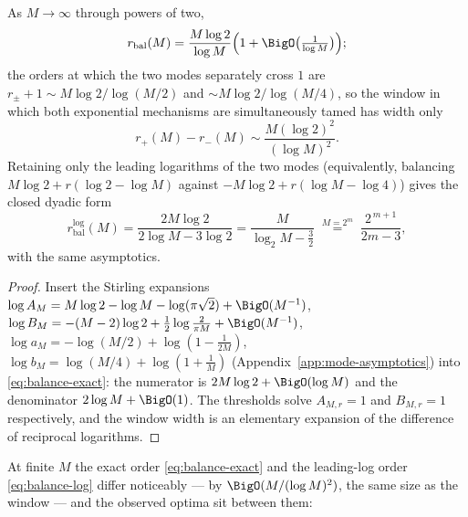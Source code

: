 \begin{proposition}
\label{prop:balance-asymptotic}
As $M\to\infty$ through powers of two,
\begin{equation}
 r_{\mathrm{bal}}(M)
 =\frac{M\log2}{\log M}
 \Bigl(1+\BigO\bigl(\tfrac1{\log M}\bigr)\Bigr);
 \label{eq:balance-asymptotic}
\end{equation}
the orders at which the two modes separately cross $1$ are
$r_\pm+1\sim M\log2/\log(M/2)$ and $\sim M\log2/\log(M/4)$, so the
window in which both exponential mechanisms are simultaneously tamed
has width only
\begin{equation}
 r_+(M)-r_-(M)\sim\frac{M(\log2)^{2}}{(\log M)^{2}}.
 \label{eq:window-width}
\end{equation}
Retaining only the leading logarithms of the two modes
(equivalently, balancing $M\log2+r(\log2-\log M)$ against
$-M\log2+r(\log M-\log4)$) gives the closed dyadic form
\begin{equation}
 r_{\mathrm{bal}}^{\log}(M)
 =\frac{2M\log2}{2\log M-3\log2}
 =\frac{M}{\log_2M-\tfrac32}
 \;\overset{M=2^{m}}{=}\;
 \frac{2^{\,m+1}}{2m-3},
 \label{eq:balance-log}
\end{equation}
with the same asymptotics.
\end{proposition}

\begin{proof}
Insert the Stirling expansions
$\log A_M=M\log2-\log M-\log(\pi\sqrt2)+\BigO(M^{-1})$,
$\log B_M=-(M-2)\log2+\tfrac12\log\tfrac2{\pi M}+\BigO(M^{-1})$,
$\log a_M=-\log(M/2)+\log(1-\tfrac1{2M})$,
$\log b_M=\log(M/4)+\log(1+\tfrac1M)$
(Appendix~\ref{app:mode-asymptotics}) into \eqref{eq:balance-exact}: the
numerator is $2M\log2+\BigO(\log M)$ and the denominator
$2\log M+\BigO(1)$.  The thresholds solve
$A_{M,r}=1$ and $B_{M,r}=1$ respectively, and the window width is an
elementary expansion of the difference of reciprocal logarithms.
\end{proof}

At finite $M$ the exact order \eqref{eq:balance-exact} and the
leading-log order \eqref{eq:balance-log} differ noticeably --- by
$\BigO(M/(\log M)^2)$, the same size as the window --- and the
observed optima sit between them:

